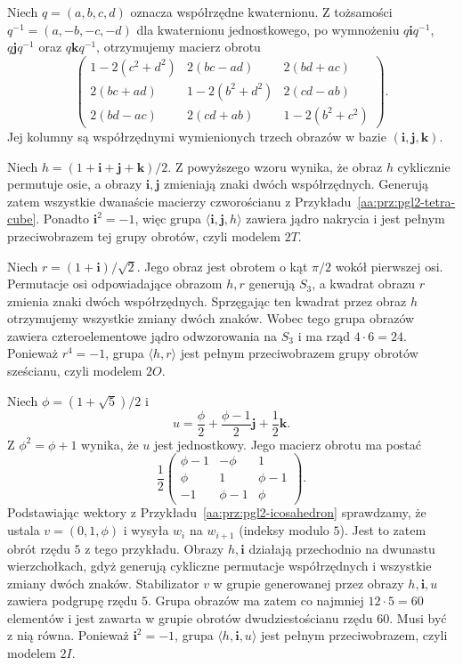 Niech $q=(a,b,c,d)$ oznacza współrzędne kwaternionu.
Z tożsamości $q^{-1}=(a,-b,-c,-d)$ dla kwaternionu
jednostkowego, po wymnożeniu $q\mathbf i q^{-1}$,
$q\mathbf j q^{-1}$ oraz $q\mathbf k q^{-1}$,
otrzymujemy macierz obrotu
\[
 \begin{pmatrix}
 1-2(c^2+d^2)&2(bc-ad)&2(bd+ac)\\
 2(bc+ad)&1-2(b^2+d^2)&2(cd-ab)\\
 2(bd-ac)&2(cd+ab)&1-2(b^2+c^2)
 \end{pmatrix}.
\]
Jej kolumny są współrzędnymi wymienionych trzech obrazów
w bazie $(\mathbf i,\mathbf j,\mathbf k)$.

\begin{przyklad}
\label{aa:prz:binary-quaternion-generators}
Niech $h=(1+\mathbf i+\mathbf j+\mathbf k)/2$.
Z powyższego wzoru wynika, że obraz $h$ cyklicznie
permutuje osie, a obrazy $\mathbf i,\mathbf j$
zmieniają znaki dwóch współrzędnych.
Generują zatem wszystkie dwanaście macierzy
czworościanu z Przykładu~\ref{aa:prz:pgl2-tetra-cube}.
Ponadto $\mathbf i^2=-1$, więc grupa
$\langle\mathbf i,\mathbf j,h\rangle$ zawiera jądro
nakrycia i jest pełnym przeciwobrazem tej grupy obrotów,
czyli modelem $2T$.

Niech $r=(1+\mathbf i)/\sqrt2$.
Jego obraz jest obrotem o kąt $\pi/2$ wokół pierwszej osi.
Permutacje osi odpowiadające obrazom $h,r$ generują $S_3$,
a kwadrat obrazu $r$ zmienia znaki dwóch współrzędnych.
Sprzęgając ten kwadrat przez obraz $h$ otrzymujemy
wszystkie zmiany dwóch znaków. Wobec tego grupa
obrazów zawiera czteroelementowe jądro odwzorowania
na $S_3$ i ma rząd $4\cdot6=24$.
Ponieważ $r^4=-1$, grupa $\langle h,r\rangle$
jest pełnym przeciwobrazem grupy obrotów sześcianu,
czyli modelem $2O$.

Niech $\phi=(1+\sqrt5)/2$ i
\[
 u=\frac{\phi}{2}+\frac{\phi-1}{2}\mathbf j
       +\frac12\mathbf k .
\]
Z $\phi^2=\phi+1$ wynika, że $u$ jest jednostkowy.
Jego macierz obrotu ma postać
\[
 \frac12\begin{pmatrix}
 \phi-1&-\phi&1\\
 \phi&1&\phi-1\\
 -1&\phi-1&\phi
 \end{pmatrix}.
\]
Podstawiając wektory z Przykładu~\ref{aa:prz:pgl2-icosahedron}
sprawdzamy, że ustala $v=(0,1,\phi)$
i wysyła $w_i$ na $w_{i+1}$ (indeksy modulo $5$).
Jest to zatem obrót rzędu $5$ z tego przykładu.
Obrazy $h,\mathbf i$ działają przechodnio na dwunastu
wierzchołkach, gdyż generują cykliczne permutacje
współrzędnych i wszystkie zmiany dwóch znaków.
Stabilizator $v$ w grupie generowanej przez obrazy
$h,\mathbf i,u$ zawiera podgrupę rzędu $5$.
Grupa obrazów ma zatem co najmniej $12\cdot5=60$
elementów i jest zawarta w grupie obrotów dwudziestościanu
rzędu $60$. Musi być z nią równa.
Ponieważ $\mathbf i^2=-1$, grupa
$\langle h,\mathbf i,u\rangle$ jest pełnym przeciwobrazem,
czyli modelem $2I$.
\end{przyklad}

